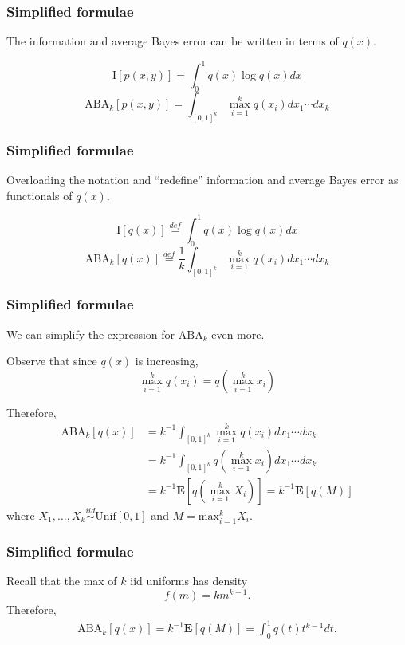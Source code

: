 \documentclass{beamer}
\newcommand{\E}{\textbf{E}}
\begin{document}
\begin{frame}
\frametitle{Simplified formulae}

The information and average Bayes error can be written in terms of $q(x)$.

\[
\text{I}[p(x, y)] = \int_0^1 q(x) \log q(x) dx
\]
\[
\text{ABA}_k[p(x, y)] = \int_{[0, 1]^k} \max_{i=1}^k q(x_i) dx_1 \cdots dx_k
\]

\end{frame}

\begin{frame}
\frametitle{Simplified formulae}

Overloading the notation and ``redefine'' information and average Bayes error as functionals of $q(x)$.

\[
\text{I}[q(x)] \stackrel{def}{=} \int_0^1 q(x) \log q(x) dx
\]
\[
\text{ABA}_k[q(x)] \stackrel{def}{=} \frac{1}{k}\int_{[0, 1]^k} \max_{i=1}^k q(x_i) dx_1 \cdots dx_k
\]

\end{frame}

\begin{frame}
\frametitle{Simplified formulae}

We can simplify the expression for $\text{ABA}_k$ even more.

Observe that since $q(x)$ is increasing,
\[
\max_{i=1}^k q(x_i) = q\left(\max_{i=1}^k x_i\right)
\]

Therefore,
\begin{align*}
\text{ABA}_k[q(x)] &= k^{-1}\int_{[0, 1]^k} \max_{i=1}^k q(x_i) dx_1 \cdots dx_k
\\&= k^{-1}\int_{[0, 1]^k} q\left(\max_{i=1}^k x_i\right) dx_1 \cdots dx_k
\\&= k^{-1}\E\left[q\left(\max_{i=1}^k X_i\right)\right] = k^{-1}\E[q(M)]
\end{align*}
where $X_1,\hdots, X_k \stackrel{iid}{\sim} \text{Unif}[0,1]$ and $M = \text{max}_{i=1}^k X_i$.

\end{frame}

\begin{frame}
\frametitle{Simplified formulae}

Recall that the max of $k$ iid uniforms has density
\[
f(m) = km^{k-1}.
\]
Therefore,
\begin{align*}
\text{ABA}_k[q(x)] =  k^{-1}\E[q(M)] = \int_0^1 q(t) t^{k-1} dt.
\end{align*}

\end{frame}
\end{document}
